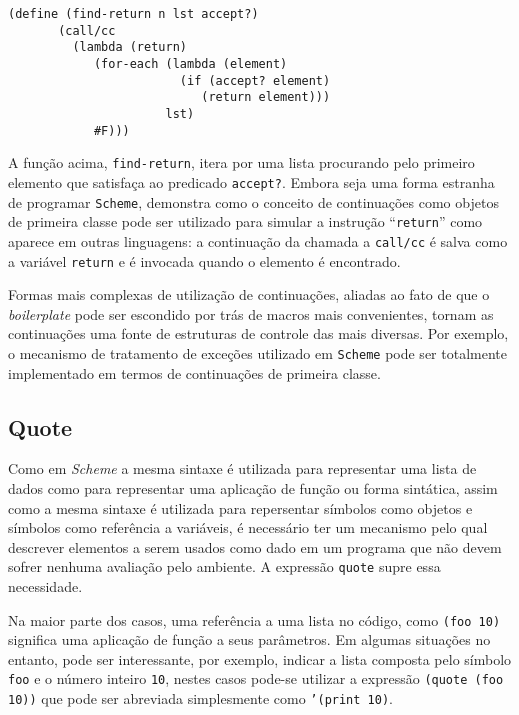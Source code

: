 \begin{lstlisting}[frame=none]
    (define (find-return n lst accept?)
       (call/cc 
         (lambda (return)
            (for-each (lambda (element)
                        (if (accept? element)
                           (return element)))
                      lst)
            #F)))
\end{lstlisting}

A função acima, \texttt{find-return}, itera por uma lista procurando pelo 
primeiro elemento que satisfaça ao predicado \texttt{accept?}. Embora seja uma 
forma estranha de programar \texttt{Scheme}, demonstra como o conceito de 
continuações como objetos de primeira classe pode ser utilizado para simular
a instrução ``\texttt{return}'' como aparece em outras linguagens: a continuação
da chamada a \texttt{call/cc} é salva como a variável \texttt{return} e é 
invocada quando o elemento é encontrado. 

Formas mais complexas de utilização de continuações, aliadas ao fato de que o
\textit{boilerplate} pode ser escondido por trás de macros mais convenientes,
tornam as continuações uma fonte de estruturas de controle das mais diversas.
Por exemplo, o mecanismo de tratamento de exceções utilizado em \texttt{Scheme}
pode ser totalmente implementado em termos de continuações de primeira classe.

\subsection{Quote}
\label{ss:quote}

Como em \textit{Scheme} a mesma sintaxe é utilizada para representar uma lista
de dados como para representar uma aplicação de função ou forma sintática,
assim como a mesma sintaxe é utilizada para repersentar símbolos como objetos e
símbolos como referência a variáveis, é necessário ter um mecanismo pelo qual
descrever elementos a serem usados como dado em um programa que não devem
sofrer nenhuma avaliação pelo ambiente. A expressão \texttt{quote} supre essa
necessidade.

Na maior parte dos casos, uma referência a uma lista no código, como
\texttt{(foo 10)} significa uma aplicação de função a seus parâmetros. Em 
algumas situações no entanto, pode ser interessante, por exemplo, indicar a lista
composta pelo símbolo \texttt{foo} e o número inteiro \texttt{10}, nestes
casos pode-se utilizar a expressão \texttt{(quote (foo 10))} que pode ser 
abreviada simplesmente como \texttt{'(print 10)}. 


